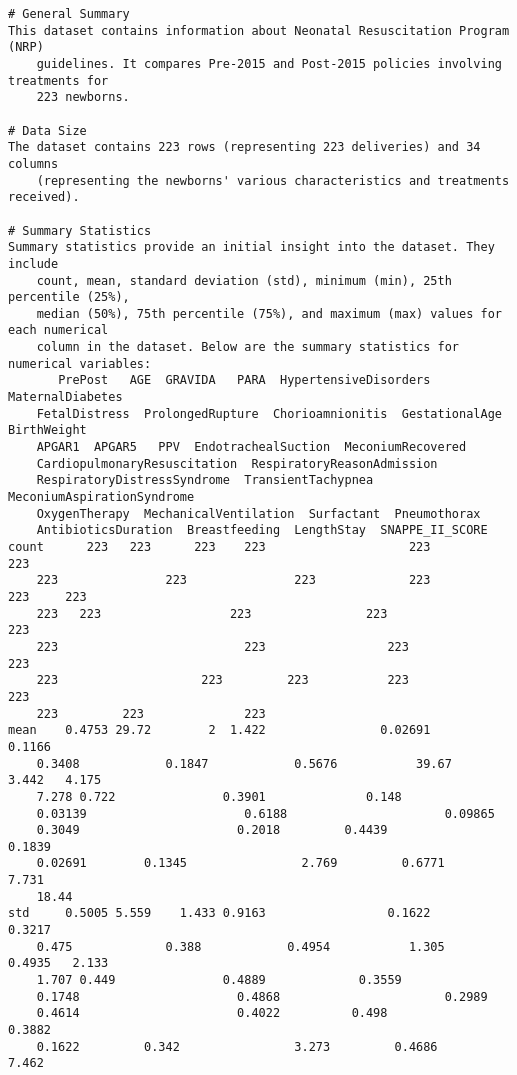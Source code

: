 \documentclass[11pt]{article}
\begin{document}
\begin{Verbatim}[tabsize=4]
# General Summary
This dataset contains information about Neonatal Resuscitation Program (NRP)
	guidelines. It compares Pre-2015 and Post-2015 policies involving treatments for
	223 newborns.

# Data Size
The dataset contains 223 rows (representing 223 deliveries) and 34 columns
	(representing the newborns' various characteristics and treatments received).

# Summary Statistics
Summary statistics provide an initial insight into the dataset. They include
	count, mean, standard deviation (std), minimum (min), 25th percentile (25%),
	median (50%), 75th percentile (75%), and maximum (max) values for each numerical
	column in the dataset. Below are the summary statistics for numerical variables:
       PrePost   AGE  GRAVIDA   PARA  HypertensiveDisorders  MaternalDiabetes
	FetalDistress  ProlongedRupture  Chorioamnionitis  GestationalAge  BirthWeight
	APGAR1  APGAR5   PPV  EndotrachealSuction  MeconiumRecovered
	CardiopulmonaryResuscitation  RespiratoryReasonAdmission
	RespiratoryDistressSyndrome  TransientTachypnea  MeconiumAspirationSyndrome
	OxygenTherapy  MechanicalVentilation  Surfactant  Pneumothorax
	AntibioticsDuration  Breastfeeding  LengthStay  SNAPPE_II_SCORE
count      223   223      223    223                    223               223
	223               223               223             223          223     223
	223   223                  223                223                           223
	223                          223                 223                         223
	223                    223         223           223                  223
	223         223              223
mean    0.4753 29.72        2  1.422                0.02691            0.1166
	0.3408            0.1847            0.5676           39.67        3.442   4.175
	7.278 0.722               0.3901              0.148
	0.03139                      0.6188                      0.09865
	0.3049                      0.2018         0.4439                 0.1839
	0.02691        0.1345                2.769         0.6771       7.731
	18.44
std     0.5005 5.559    1.433 0.9163                 0.1622            0.3217
	0.475             0.388            0.4954           1.305       0.4935   2.133
	1.707 0.449               0.4889             0.3559
	0.1748                      0.4868                       0.2989
	0.4614                      0.4022          0.498                 0.3882
	0.1622         0.342                3.273         0.4686       7.462

\end{Verbatim}
\end{document}
